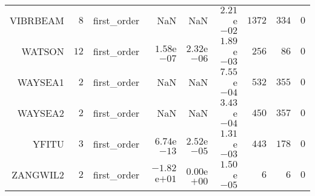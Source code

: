 \begin{longtable}{rrrrrrrrr}
VIBRBEAM & \(     8\) & first\_order &       NaN &       NaN & \( 2.21\)e\(-02\) & \(  1372\) & \(   334\) & \(     0\) \\
WATSON & \(    12\) & first\_order & \( 1.58\)e\(-07\) & \( 2.32\)e\(-06\) & \( 1.89\)e\(-03\) & \(   256\) & \(    86\) & \(     0\) \\
WAYSEA1 & \(     2\) & first\_order &       NaN &       NaN & \( 7.55\)e\(-04\) & \(   532\) & \(   355\) & \(     0\) \\
WAYSEA2 & \(     2\) & first\_order &       NaN &       NaN & \( 3.43\)e\(-04\) & \(   450\) & \(   357\) & \(     0\) \\
YFITU & \(     3\) & first\_order & \( 6.74\)e\(-13\) & \( 2.52\)e\(-05\) & \( 1.31\)e\(-03\) & \(   443\) & \(   178\) & \(     0\) \\
ZANGWIL2 & \(     2\) & first\_order & \(-1.82\)e\(+01\) & \( 0.00\)e\(+00\) & \( 1.50\)e\(-05\) & \(     6\) & \(     6\) & \(     0\) \\\hline
\end{longtable}
